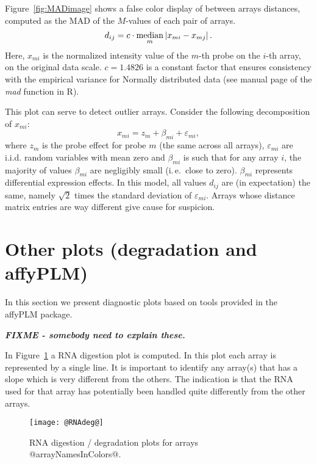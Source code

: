 \documentclass[11pt]{article}
\newcommand{\Rpackage}[1]{{\textsf{#1}}}
\begin{document}
Figure~\ref{fig:MADimage} shows a false color display of between arrays
distances, computed as the MAD of the $M$-values of each pair of
arrays.
\begin{equation*}
d_{ij} = c\cdot \displaystyle \operatornamewithlimits{median}_{m} 
  \left| x_{mi}- x_{mj}\right|.
\end{equation*}
Here, $x_{mi}$ is the normalized intensity value of the $m$-th probe
on the $i$-th array, on the original data scale. $c=1.4826$ is a constant factor
that ensures consistency with the empirical variance for Normally
distributed data (see manual page of the \textit{mad} function in R).
 
This plot can serve to detect outlier arrays.
Consider the following decomposition of $x_{mi}$:
\begin{equation}
x_{mi}= z_m + \beta_{mi} + \varepsilon_{mi},
\end{equation}
where $z_m$ is the probe effect for probe $m$ (the same across all
arrays), $\varepsilon_{mi}$ are i.i.d. random variables with mean zero
and $\beta_{mi}$ is such that for any array $i$, the majority of values
$\beta_{mi}$ are negligibly small (i.\,e.\ close to zero).
$\beta_{mi}$ represents differential expression effects.  In this
model, all values $d_{ij}$ are (in expectation) the same, namely
$\sqrt{2}$ times the standard deviation of $\varepsilon_{mi}$.  Arrays
whose distance matrix entries are way different give cause for
suspicion.

\section{Other plots (degradation and affyPLM)}

In this section we present diagnostic plots based on tools provided
in the \Rpackage{affyPLM} package.

\textit{\textbf{FIXME - somebody need to explain these.}}

In Figure~\ref{fig:rnadeg} a RNA digestion plot is computed. In this plot
each array is represented by a single line. It is important to identify 
any array(s) that has a slope which is very different from the others. 
The indication is that the RNA used for that array has potentially 
been handled quite differently from the other arrays. 

\begin{figure}[tp]
  \centering
\texttt{[image: @RNAdeg@]}
\caption{\label{fig:rnadeg}%
RNA digestion / degradation plots for arrays @arrayNamesInColors@.}
\end{figure}
\end{document}
